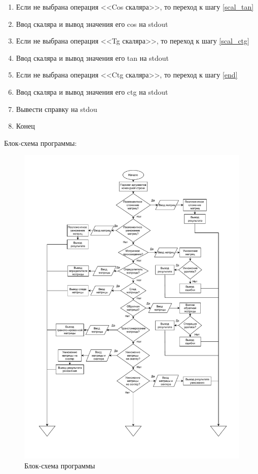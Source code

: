 \documentclass[a4paper,14pt]{extarticle}
\begin{document}
\begin{enumerate}
\item \label{scal_cos}
Если не выбрана операция <<Cos скаляра>>, то переход к шагу \ref{scal_tan}
\item Ввод скаляра и вывод значения его cos на stdout	
	
\item \label{scal_tan} 
Если не выбрана операция <<Tg скаляра>>, то переход к шагу \ref{scal_ctg}
\item Ввод скаляра и вывод значения его tan на stdout	
	
\item \label{scal_ctg}
Если не выбрана операция <<Ctg скаляра>>, то переход к шагу \ref{end}
\item Ввод скаляра и вывод значения его ctg на stdout 	
	
\item \label{end} Вывести справку на stdou
	
\item Конец 
\end{enumerate}
	
\newpage	
	
Блок-схема программы:	
\begin{figure}[H]
	\includegraphics[page=1, width=\textwidth]{include/block_scheme.pdf}
	\caption{Блок-схема программы}
\end{figure}
\end{document}
